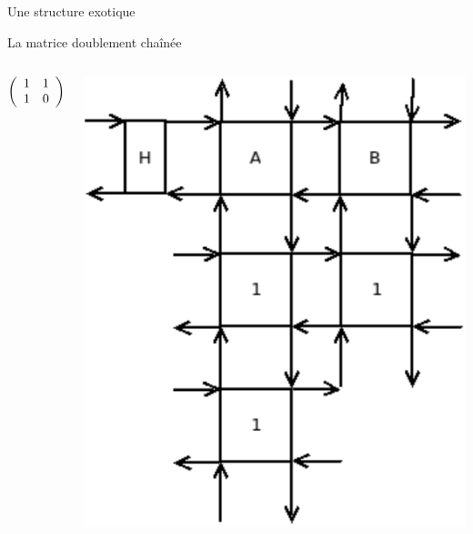 \documentclass{beamer}
\begin{document}
\begin{frame}{Une structure exotique}

La matrice doublement chaînée

 \begin{columns}
\begin{center}$
\left(\begin{array}{ c c c c c }
   1 & 1 \\
   1 & 0 
  \end{array}\right)$
\end{center}

\includegraphics[scale=0.4]{../imports/dlx_matrice.pdf}
 \end{columns}

\end{frame}
\end{document}

